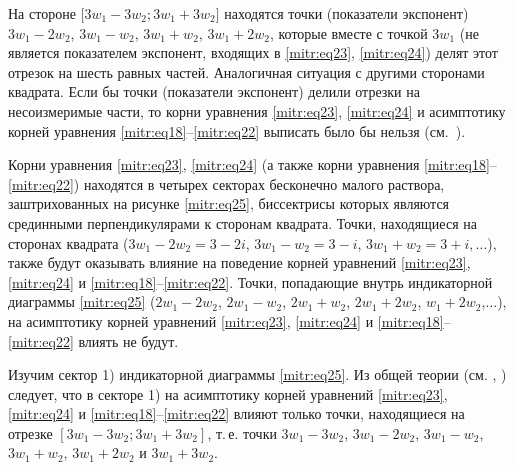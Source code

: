 На стороне $\big[{3w_1-3w_2}; {3w_1+3w_2}\big]$ находятся точки (показатели экспонент) $3w_1-2w_2$, $3w_1-w_2$, $3w_1+w_2$, $3w_1+2w_2$, которые вместе с точкой $3w_1$ (не является показателем экспонент, входящих в \eqref{mitr:eq23}, \eqref{mitr:eq24}) делят этот отрезок на шесть равных частей. Аналогичная ситуация с другими сторонами квадрата. Если бы точки (показатели экспонент) делили отрезки на несоизмеримые части, то корни уравнения \eqref{mitr:eq23}, \eqref{mitr:eq24} и асимптотику корней уравнения \eqref{mitr:eq18}--\eqref{mitr:eq22} выписать было бы нельзя (см.~\cite{mitr:bib19,mitr:bib20}).



Корни уравнения \eqref{mitr:eq23}, \eqref{mitr:eq24} (а также корни уравнения \eqref{mitr:eq18}--\eqref{mitr:eq22}) находятся в четырех секторах бесконечно малого раствора, заштрихованных на рисунке \eqref{mitr:eq25}, биссектрисы которых являются срединными перпендикулярами к сторонам квадрата. Точки, находящиеся на сторонах квадрата ($3w_1-2w_2=3-2i$, $3w_1-w_2=3-i$, $3w_1+w_2=3+i,\dots$), также будут оказывать влияние  на поведение корней уравнений \eqref{mitr:eq23}, \eqref{mitr:eq24} и \eqref{mitr:eq18}--\eqref{mitr:eq22}. Точки, попадающие внутрь индикаторной диаграммы \eqref{mitr:eq25} ($2w_1-2w_2$, $2w_1-w_2$, $2w_1+w_2$, $2w_1+2w_2$, $w_1+2w_2$,$\dots$), на асимптотику корней уравнений \eqref{mitr:eq23}, \eqref{mitr:eq24} и \eqref{mitr:eq18}--\eqref{mitr:eq22} влиять не будут.



\smallskip




Изучим сектор 1) индикаторной диаграммы \eqref{mitr:eq25}. Из общей теории (см. \cite[гл.~12]{mitr:bib18}, \cite{mitr:bib19, mitr:bib20}) следует, что в секторе 1) на асимптотику корней уравнений \eqref{mitr:eq23}, \eqref{mitr:eq24} и \eqref{mitr:eq18}--\eqref{mitr:eq22} влияют только точки, находящиеся на отрезке $[3w_1-3w_2;3w_1+3w_2]$, т.\,е. точки $3w_1-3w_2$, $3w_1-2w_2$, $3w_1-w_2$, $3w_1+w_2$, $3w_1+2w_2$ и $3w_1+3w_2$.



\smallskip



